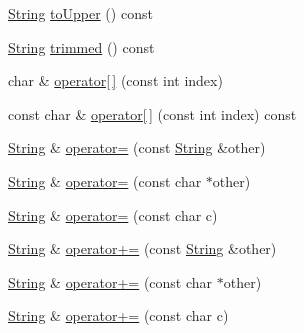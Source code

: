 \begin{DoxyCompactItemize}
\item 
\hyperlink{classprism_1_1_string}{String} \hyperlink{classprism_1_1_string_afd1fc3691cbc2f267fc3d1d8f27d2c3a}{to\+Upper} () const 
\item 
\hyperlink{classprism_1_1_string}{String} \hyperlink{classprism_1_1_string_aef7dc34213c574a72c893f943a41e8e4}{trimmed} () const 
\item 
char \& \hyperlink{classprism_1_1_string_a2aa545085262fc28c9199a5790bfbd0a}{operator\mbox{[}$\,$\mbox{]}} (const int index)
\item 
const char \& \hyperlink{classprism_1_1_string_ad519fe1a0696fe5c4b77808d605bc68e}{operator\mbox{[}$\,$\mbox{]}} (const int index) const 
\item 
\hyperlink{classprism_1_1_string}{String} \& \hyperlink{classprism_1_1_string_ad2c84ac36bccdb26c446d32a1615f321}{operator=} (const \hyperlink{classprism_1_1_string}{String} \&other)
\item 
\hyperlink{classprism_1_1_string}{String} \& \hyperlink{classprism_1_1_string_a72162e465f226763b741467865d506e2}{operator=} (const char $\ast$other)
\item 
\hyperlink{classprism_1_1_string}{String} \& \hyperlink{classprism_1_1_string_a61f21a091fec77de84ceab239b6d9c7d}{operator=} (const char c)
\item 
\hyperlink{classprism_1_1_string}{String} \& \hyperlink{classprism_1_1_string_a8d509ab7982bc6176c58f5fbce1da15c}{operator+=} (const \hyperlink{classprism_1_1_string}{String} \&other)
\item 
\hyperlink{classprism_1_1_string}{String} \& \hyperlink{classprism_1_1_string_a1a282edfd99b7570eb83a8c1188c5e2b}{operator+=} (const char $\ast$other)
\item 
\hyperlink{classprism_1_1_string}{String} \& \hyperlink{classprism_1_1_string_a28499824b5ab71a12c7f296e1428cf79}{operator+=} (const char c)
\end{DoxyCompactItemize}
